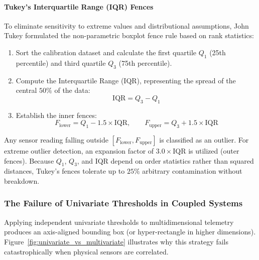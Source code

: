 \paragraph{Tukey's Interquartile Range (IQR) Fences}
To eliminate sensitivity to extreme values and distributional assumptions, John Tukey formulated the non-parametric boxplot fence rule based on rank statistics:
\begin{enumerate}
    \item Sort the calibration dataset and calculate the first quartile $Q_1$ (25th percentile) and third quartile $Q_3$ (75th percentile).
    \item Compute the Interquartile Range ($\text{IQR}$), representing the spread of the central $50\%$ of the data:
    \begin{equation}
    \text{IQR} = Q_3 - Q_1\label{eq:iqr}
    \end{equation}
    \item Establish the inner fences:
    \begin{equation}
    F_{\text{lower}} = Q_1 - 1.5 \times \text{IQR}, \qquad F_{\text{upper}} = Q_3 + 1.5 \times \text{IQR}\label{eq:tukey_fences}
    \end{equation}
\end{enumerate}
Any sensor reading falling outside $[F_{\text{lower}}, F_{\text{upper}}]$ is classified as an outlier. For extreme outlier detection, an expansion factor of $3.0 \times \text{IQR}$ is utilized (outer fences). Because $Q_1$, $Q_3$, and $\text{IQR}$ depend on order statistics rather than squared distances, Tukey's fences tolerate up to $25\%$ arbitrary contamination without breakdown.

\subsubsection{The Failure of Univariate Thresholds in Coupled Systems}

Applying independent univariate thresholds to multidimensional telemetry produces an axis-aligned bounding box (or hyper-rectangle in higher dimensions). Figure~\ref{fig:univariate_vs_multivariate} illustrates why this strategy fails catastrophically when physical sensors are correlated.

